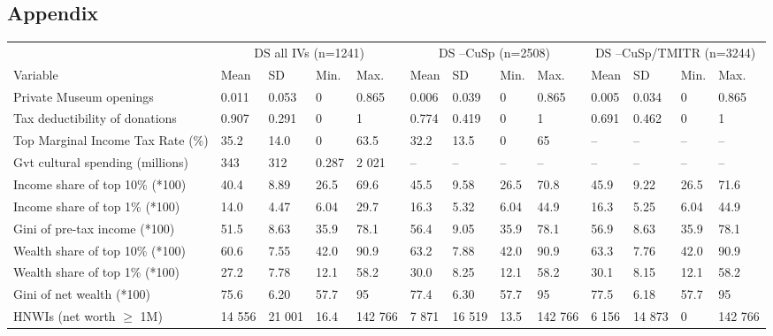 \documentclass[11pt]{article}
\begin{document}
\clearpage
\FloatBarrier




\subsection*{Appendix}


\begin{landscape}
\begin{table}[ht]
\centering
\begin{tabular}{p{7cm}llllllllllll}
  \hline 
  & \multicolumn{4}{c}{DS all IVs (n=1241)} & \multicolumn{4}{c}{DS --CuSp (n=2508)} & \multicolumn{4}{c}{DS --CuSp/TMITR (n=3244)} \\ 
\cmidrule(r){2-5}\cmidrule(r){6-9}\cmidrule(r){10-13}  
 Variable & Mean & SD & Min. & Max. & Mean & SD & Min. & Max. & Mean & SD & Min. & Max. \\ 
  \hline
Private Museum openings & 0.011 & 0.053 & 0 & 0.865 & 0.006 & 0.039 & 0 & 0.865 & 0.005 & 0.034 & 0 & 0.865 \\ 
  Tax deductibility of donations & 0.907 & 0.291 & 0 & 1 & 0.774 & 0.419 & 0 & 1 & 0.691 & 0.462 & 0 & 1 \\ 
  Top Marginal Income Tax Rate (\%) & 35.2 & 14.0 & 0 & 63.5 & 32.2 & 13.5 & 0 & 65 & -- & -- & -- & -- \\ 
  Gvt cultural spending (millions) & 343 & 312 & 0.287 & 2 021 & -- & -- & -- & -- & -- & -- & -- & -- \\ 
  Income share of top 10\% (*100) & 40.4 & 8.89 & 26.5 & 69.6 & 45.5 & 9.58 & 26.5 & 70.8 & 45.9 & 9.22 & 26.5 & 71.6 \\ 
  Income share of top 1\% (*100) & 14.0 & 4.47 & 6.04 & 29.7 & 16.3 & 5.32 & 6.04 & 44.9 & 16.3 & 5.25 & 6.04 & 44.9 \\ 
  Gini of pre-tax income (*100) & 51.5 & 8.63 & 35.9 & 78.1 & 56.4 & 9.05 & 35.9 & 78.1 & 56.9 & 8.63 & 35.9 & 78.1 \\ 
  Wealth share of top 10\% (*100) & 60.6 & 7.55 & 42.0 & 90.9 & 63.2 & 7.88 & 42.0 & 90.9 & 63.3 & 7.76 & 42.0 & 90.9 \\ 
  Wealth share of top 1\% (*100) & 27.2 & 7.78 & 12.1 & 58.2 & 30.0 & 8.25 & 12.1 & 58.2 & 30.1 & 8.15 & 12.1 & 58.2 \\ 
  Gini of net wealth (*100) & 75.6 & 6.20 & 57.7 & 95 & 77.4 & 6.30 & 57.7 & 95 & 77.5 & 6.18 & 57.7 & 95 \\ 
  HNWIs (net worth $\geq$ 1M) & 14 556 & 21 001 & 16.4 & 142 766 & 7 871 & 16 519 & 13.5 & 142 766 & 6 156 & 14 873 & 0 & 142 766 \\ 

\end{tabular}
\end{table}
\end{landscape}
\end{document}
